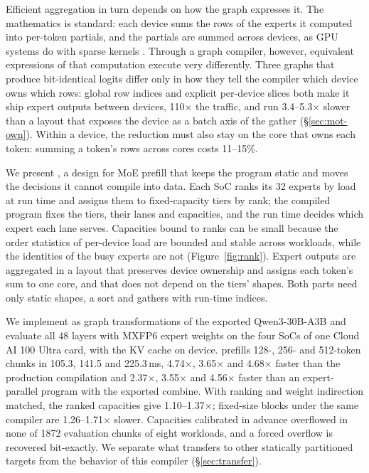 Efficient aggregation in turn depends on how the graph expresses it. The mathematics is standard: each device sums the
rows of the experts it computed into per-token partials, and the partials are summed across devices, as GPU systems do
with sparse kernels \citep{hwang2023tutel,vllmmoe}. Through a graph compiler, however, equivalent expressions of that
computation execute very differently. Three graphs that produce bit-identical logits differ only in how they tell the
compiler which device owns which rows: global row indices and explicit per-device slices both make it ship expert outputs
between devices, 110$\times$ the traffic, and run 3.4--5.3$\times$ slower than a layout that exposes the device as a batch
axis of the gather (\S\ref{sec:mot-own}). Within a device, the reduction must also stay on the core that owns each token:
summing a token's rows across cores costs 11--15\%.

We present \sys, a design for MoE prefill that keeps the program static and moves the decisions it cannot compile into
data. Each SoC ranks its 32 experts by load at run time and assigns them to fixed-capacity tiers by rank; the compiled
program fixes the tiers, their lanes and capacities, and the run time decides which expert each lane serves. Capacities
bound to ranks can be small because the order statistics of per-device load are bounded and stable across workloads,
while the identities of the busy experts are not (Figure~\ref{fig:rank}). Expert outputs are aggregated in a layout that
preserves device ownership and assigns each token's sum to one core, and that does not depend on the tiers' shapes. Both
parts need only static shapes, a sort and gathers with run-time indices.

We implement \sys as graph transformations of the exported Qwen3-30B-A3B and evaluate all 48 layers with MXFP6 expert
weights on the four SoCs of one Cloud AI 100 Ultra card, with the KV cache on device. \sys prefills 128-, 256- and
512-token chunks in 105.3, 141.5 and 225.3\,ms, 4.74$\times$, 3.65$\times$ and 4.68$\times$ faster than the production compilation and
2.37$\times$, 3.55$\times$ and 4.56$\times$ faster than an expert-parallel program with the exported combine. With
ranking and weight indirection matched, the ranked capacities give 1.10--1.37$\times$; fixed-size blocks under the same
compiler are 1.26--1.71$\times$ slower. Capacities calibrated in advance overflowed in none of 1872 evaluation chunks of
eight workloads, and a forced overflow is recovered bit-exactly. We separate what transfers to other statically
partitioned targets from the behavior of this compiler (\S\ref{sec:transfer}).

